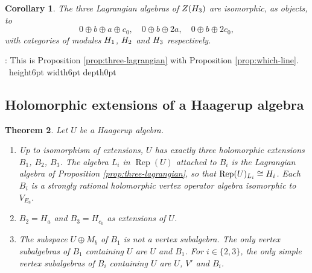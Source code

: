 \documentclass[leqno]{article}
\let\cal\relax
\newcommand{\cal}{\mathcal}
\newcommand{\qed}{\hfill \vrule height6pt  width6pt depth0pt}
\DeclareMathOperator{\Rep}{Rep} %
\newtheorem{thm}{Theorem}[section]
\newtheorem{cor}[thm]{Corollary}
\newenvironment{proof}[1][]{\noindent {\it Proof #1} : }{\hbox{~}\qed
\smallskip
}
\numberwithin{equation}{section}
\begin{document}
\begin{cor}
\label{cor:categorical}
The three Lagrangian algebras of $Z(\cal H_3)$ are isomorphic, as objects, to
\[
0 \oplus b \oplus a \oplus c_0,\quad 0 \oplus b \oplus 2a,\quad 0 \oplus b \oplus 2c_0,
\]
with categories of modules $\cal H_1$, $\cal H_2$ and $\cal H_3$ respectively.
\end{cor}

\begin{proof}
This is Proposition \ref{prop:three-lagrangian} with Proposition \ref{prop:which-line}.
\end{proof}


\subsection{Holomorphic extensions of a Haagerup algebra}

\begin{thm}
\label{thm:lagrangian-extensions}
Let $U$ be a Haagerup algebra.
\begin{enumerate}
\item Up to isomorphism of extensions, $U$ has exactly three holomorphic extensions $B_1$, $B_2$, $B_3$. The algebra $L_i$ in $\Rep(U)$ attached to $B_i$ is the Lagrangian algebra of Proposition \ref{prop:three-lagrangian}, so that $\Rep(U)_{L_i} \cong \cal H_i$. Each $B_i$ is a strongly rational holomorphic vertex operator algebra isomorphic to $V_{E_8}$.
\item $B_2 = H_a$ and $B_3 = H_{c_0}$ as extensions of $U$.
\item The subspace $U \oplus M_b$ of $B_1$ is not a vertex subalgebra. The only vertex subalgebras of $B_1$ containing $U$ are $U$ and $B_1$. For $i \in \{2,3\}$, the only simple vertex subalgebras of $B_i$ containing $U$ are $U$, $V'$ and $B_i$.
\end{enumerate}
\end{thm}
\end{document}
